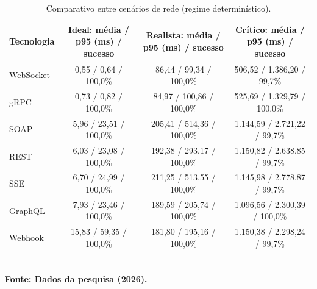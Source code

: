 \begin{table}[H]
\centering
\scriptsize
\caption{Comparativo entre cenários de rede (regime determinístico).}
\label{tab:resumo_cenarios}
\begin{tabular}{|l|c|c|c|}
\hline
\textbf{Tecnologia} & \textbf{Ideal: média / p95 (ms) / sucesso} & \textbf{Realista: média / p95 (ms) / sucesso} & \textbf{Crítico: média / p95 (ms) / sucesso} \\ \hline
WebSocket & 0,55 / 0,64 / 100,0\% & 86,44 / 99,34 / 100,0\% & 506,52 / 1.386,20 / 99,7\% \\ \hline
gRPC & 0,73 / 0,82 / 100,0\% & 84,97 / 100,86 / 100,0\% & 525,69 / 1.329,79 / 100,0\% \\ \hline
SOAP & 5,96 / 23,51 / 100,0\% & 205,41 / 514,36 / 100,0\% & 1.144,59 / 2.721,22 / 99,7\% \\ \hline
REST & 6,03 / 23,08 / 100,0\% & 192,38 / 293,17 / 100,0\% & 1.150,82 / 2.638,85 / 99,7\% \\ \hline
SSE & 6,70 / 24,99 / 100,0\% & 211,25 / 513,55 / 100,0\% & 1.145,98 / 2.778,87 / 99,7\% \\ \hline
GraphQL & 7,93 / 23,46 / 100,0\% & 189,59 / 205,74 / 100,0\% & 1.096,56 / 2.300,39 / 100,0\% \\ \hline
Webhook & 15,83 / 59,35 / 100,0\% & 181,80 / 195,16 / 100,0\% & 1.150,38 / 2.298,24 / 99,7\% \\ \hline
\end{tabular}
{\footnotesize\\ \textbf{Fonte: Dados da pesquisa (2026).}}
\end{table}
